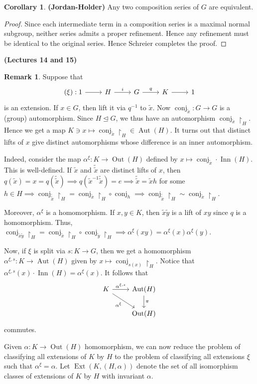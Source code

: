 \documentclass[10pt,letterpaper,cm]{nupset}
\theoremstyle{definition}
\newtheorem{remark}{Remark}
\newtheorem{corollary}{Corollary}
\newcommand{\1}{\mathbf{1}}
\newcommand{\0}{\vec 0}
\DeclareMathOperator{\aut}{Aut}
\DeclareMathOperator{\ext}{Ext}
\DeclareMathOperator{\inn}{Inn}
\DeclareMathOperator{\out}{Out}
\DeclareMathOperator{\conj}{conj}
\begin{document}
\begin{corollary}{\textbf{(Jordan-Holder)}}
Any two composition series of $G$ are equivalent.
\end{corollary}
\begin{proof}
Since each intermediate term in a composition series is a maximal normal subgroup, neither series admits a proper refinement. Hence any refinement must be identical to the original series. Hence Schreier completes the proof.
\end{proof}

\begin{center}
{\textbf{(Lectures 14 and 15)}}
\end{center}

\begin{remark} 
Suppose that 
\[ 
\begin{tikzcd}
(\xi): 1 \arrow[r] & H \arrow[r, "i"] & G \arrow[r, "q"] & K \arrow[r] & 1
\end{tikzcd}
\]
is an extension. If $x \in G$, then lift it via $q^{-1}$ to $\tilde{x}$. Now $\conj_{\tilde{x}} : G \to G$ is a (group) automorphism. Since $H\unlhd G$, we thus have an automorphism $\conj_{\tilde{x}}\restriction_H$. Hence we get a map $K \ni x \mapsto \conj_{\tilde{x}}\restriction_H \in \aut(H)$. It turns out that distinct lifts of $x$ give distinct automorphisms whose difference is an inner automorphism.

Indeed, consider the map $\alpha^{\xi} : K \to \out(H)$ defined by $x \mapsto \conj_{\tilde{x}}\cdot \inn(H)$. This is well-defined. If $\tilde{x}$ and $\tilde{\tilde{x}}$ are distinct lifts of $x$, then $q(\tilde{x}) = x = q(\tilde{\tilde{x}}) \implies q(\tilde{x}^{-1}\tilde{\tilde{x}}) = e \implies \tilde{\tilde{x}} = \tilde{x}h$ for some $h \in H \implies \conj_{\tilde{\tilde{x}}}\restriction_H= \conj_{\tilde{x}}\restriction_H \circ \conj_h \implies \conj_{\tilde{\tilde{x}}}\restriction_H\sim \conj_{\tilde{x}}\restriction_H$.

Moreover, $\alpha^{\xi}$ is a homomorphism. If $x, y \in K$, then $\tilde{x}\tilde{y}$ is a lift of $xy$ since $q$ is a homomorphism.  Thus, $\conj_{\tilde{x}\tilde{y}}\restriction_H = \conj_{\tilde{x}}\restriction_H \circ \conj_{\tilde{y}}\restriction_H \implies \alpha^{\xi}(xy) = \alpha^{\xi}(x) \alpha^{\xi}(y)$.

Now, if $\xi$ is split via $s: K \to G$, then we get a homomorphism $\alpha^{\xi, s} : K \to \aut(H)$ given by $x \mapsto \conj_{s(x)}\restriction_H$. Notice that $\alpha^{\xi, s}(x)\cdot \inn(H) = \alpha^{\xi}(x)$. It follows that 
\[
\begin{tikzcd}
K \arrow[r, "{\alpha^{\xi, s}}"] \arrow[rd, "\alpha^{\xi}"'] & \aut(H) \arrow[d, "\pi"] \\
 & \out(H)
\end{tikzcd}
\]
commutes.

Given $\alpha: K \to \out(H)$ homomorphism, we can now reduce the problem of classifying all extensions of $K$ by $H$ to the problem of classifying all extensions $\xi$ such that $\alpha^{\xi} = \alpha$. 
Let $\ext(K, (H, \alpha))$ denote the set of all isomorphism classes of extensions of $K$ by $H$ with invariant $\alpha$.
\end{remark}
\end{document}
